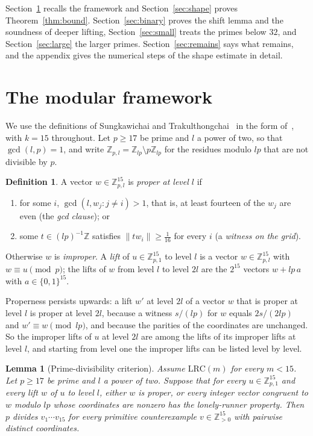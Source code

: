 \documentclass[11pt]{amsart}
\newtheorem{lemma}[theorem]{Lemma}
\theoremstyle{definition}
\newtheorem{definition}[theorem]{Definition}
\theoremstyle{remark}
\newcommand{\Z}{\mathbb{Z}}
\newcommand{\LRC}{\mathrm{LRC}}
\begin{document}
Section~\ref{sec:framework} recalls the framework and
Section~\ref{sec:shape} proves Theorem~\ref{thm:bound}.
Section~\ref{sec:binary} proves the shift lemma and the soundness of deeper
lifting, Section~\ref{sec:small} treats the primes below $32$, and
Section~\ref{sec:large} the larger primes. Section~\ref{sec:remains} says
what remains, and the appendix gives the numerical steps of the shape
estimate in detail.

\section{The modular framework}\label{sec:framework}

We use the definitions of Sungkawichai and Trakulthongchai~\cite{ST26} in the
form of~\cite[Sect.~2]{All26}, with $k=15$ throughout. Let $p\ge17$ be prime
and $l$ a power of two, so that $\gcd(l,p)=1$, and write
$\Z_{p,l}=\Z_{lp}\setminus p\Z_{lp}$ for the residues modulo $lp$ that are not
divisible by $p$.

\begin{definition}\label{def:proper}
A vector $w\in\Z_{p,l}^{15}$ is \emph{proper at level $l$} if
\begin{enumerate}[label=(\alph*),leftmargin=2em]
\item for some $i$, $\gcd(l,w_j:j\ne i)>1$, that is, at least fourteen of
the $w_j$ are even (the \emph{gcd clause}); or
\item some $t\in(lp)^{-1}\Z$ satisfies $\|tw_i\|\ge\frac1{16}$ for every $i$
(a \emph{witness on the grid}).
\end{enumerate}
Otherwise $w$ is \emph{improper}. A \emph{lift} of $u\in\Z_{p,1}^{15}$ to
level $l$ is a vector $w\in\Z_{p,l}^{15}$ with $w\equiv u\pmod p$; the lifts of
$w$ from level $l$ to level $2l$ are the $2^{15}$ vectors $w+lp\,a$ with
$a\in\{0,1\}^{15}$.
\end{definition}

Properness persists upwards: a lift $w'$ at level $2l$ of a vector $w$ that
is proper at level $l$ is proper at level $2l$, because a witness $s/(lp)$
for $w$ equals $2s/(2lp)$ and $w'\equiv w\pmod{lp}$, and because the
parities of the coordinates are unchanged. So the improper lifts of $u$ at
level $2l$ are among the lifts of its improper lifts at level $l$, and
starting from level one the improper lifts can be listed level by level.

\begin{lemma}[Prime-divisibility criterion]\label{lem:criterion}
Assume $\LRC(m)$ for every $m<15$. Let $p\ge17$ be prime and $l$ a power of
two. Suppose that for every $u\in\Z_{p,1}^{15}$ and every lift $w$ of $u$ to
level $l$, either $w$ is proper, or every integer vector congruent to $w$
modulo $lp$ whose coordinates are nonzero has the lonely-runner property.
Then $p$ divides $v_1\cdots v_{15}$ for every primitive counterexample
$v\in\Z_{>0}^{15}$ with pairwise distinct coordinates.
\end{lemma}
\end{document}
